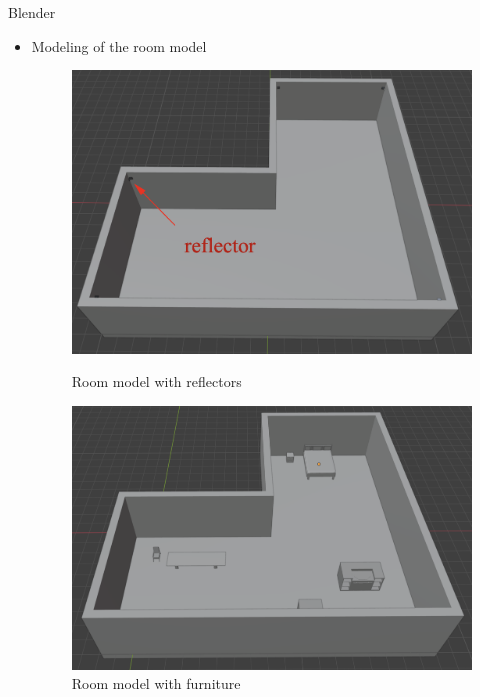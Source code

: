 \documentclass{beamer}
\begin{document}
\begin{frame}[t]{Blender}

\begin{itemize}
	\item Modeling of the room model
    \vspace{1.0\baselineskip}
    \begin{figure}
        \centering
        \begin{minipage}{0.45\textwidth}
            \centering
            \includegraphics[height=0.7\textwidth]{figures/empty_room_without_ceiling.png}
            \caption{Room model with reflectors}
        \end{minipage}
        \begin{minipage}{0.45\textwidth}
            \centering
            \includegraphics[height=0.7\textwidth]{figures/furniture_simple.png}
            \caption{Room model with furniture \cite{blender_furniture}}
        \end{minipage}
    
    \end{figure}
\end{itemize}
\end{frame}
\end{document}
